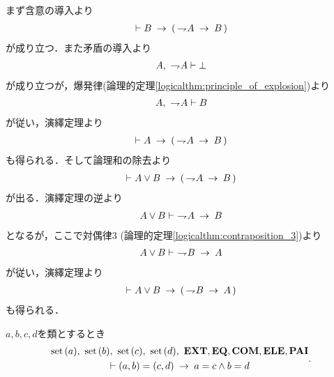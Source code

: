 	\begin{sketch}
		まず含意の導入より
		\begin{align}
			\vdash B \hspace{0.25em}\rightarrow\hspace{0.25em} (\, \rightharpoondown\hspace{-0.25em} A \hspace{0.25em}\rightarrow\hspace{0.25em} B\, )
		\end{align}
		が成り立つ．また矛盾の導入より
		\begin{align}
			A,\ \rightharpoondown\hspace{-0.25em} A \vdash \bot
		\end{align}
		が成り立つが，爆発律(論理的定理\ref{logicalthm:principle_of_explosion})より
		\begin{align}
			A,\ \rightharpoondown\hspace{-0.25em} A \vdash B
		\end{align}
		が従い，演繹定理より
		\begin{align}
			\vdash A \hspace{0.25em}\rightarrow\hspace{0.25em} (\, \rightharpoondown\hspace{-0.25em} A \hspace{0.25em}\rightarrow\hspace{0.25em} B\, )
		\end{align}
		も得られる．そして論理和の除去より
		\begin{align}
			\vdash A \vee B \hspace{0.25em}\rightarrow\hspace{0.25em} (\, \rightharpoondown\hspace{-0.25em} A \hspace{0.25em}\rightarrow\hspace{0.25em} B\, )
		\end{align}
		が出る．演繹定理の逆より
		\begin{align}
			A \vee B \vdash\ \rightharpoondown\hspace{-0.25em} A \hspace{0.25em}\rightarrow\hspace{0.25em} B
		\end{align}
		となるが，ここで対偶律$3$ (論理的定理\ref{logicalthm:contraposition_3})より
		\begin{align}
			A \vee B \vdash\ \rightharpoondown\hspace{-0.25em} B \hspace{0.25em}\rightarrow\hspace{0.25em} A
		\end{align}
		が従い，演繹定理より
		\begin{align}
			\vdash A \vee B \hspace{0.25em}\rightarrow\hspace{0.25em} (\, \rightharpoondown\hspace{-0.25em} B \hspace{0.25em}\rightarrow\hspace{0.25em} A\, )
		\end{align}
		も得られる．
		\QED
	\end{sketch}
	
	\begin{screen}
		\begin{thm}[順序対の相等性]
		\label{thm:equality_of_ordered_pairs}
			$a,b,c,d$を類とするとき
			\begin{align}
				\begin{gathered}
					\set{a},\ \set{b},\ \set{c},\ \set{d},\ \EXTAX,\EQAX,\COMAX,\ELEAX,\PAIAX \\
					\vdash (a,b) = (c,d) \rarrow a = c \wedge b = d
				\end{gathered}.
			\end{align}
		\end{thm}
	\end{screen}
	

